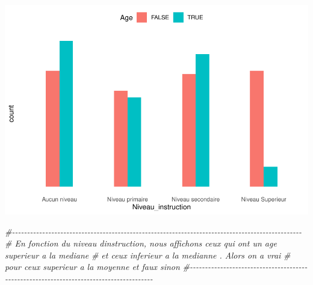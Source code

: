 \documentclass[
]{article}
\newenvironment{Shaded}{\begin{snugshade}}{\end{snugshade}}
\newcommand{\CommentTok}[1]{\textcolor[rgb]{0.56,0.35,0.01}{\textit{#1}}}
\begin{document}
\includegraphics{PROJET_files/figure-latex/unnamed-chunk-19-1.pdf}

\begin{Shaded}
\begin{Highlighting}[]
\CommentTok{\#{-}{-}{-}{-}{-}{-}{-}{-}{-}{-}{-}{-}{-}{-}{-}{-}{-}{-}{-}{-}{-}{-}{-}{-}{-}{-}{-}{-}{-}{-}{-}{-}{-}{-}{-}{-}{-}{-}{-}{-}{-}{-}{-}{-}{-}{-}{-}{-}{-}{-}{-}{-}{-}{-}{-}{-}{-}{-}{-}{-}{-}{-}{-}{-}{-}{-}{-}{-}{-}{-}{-}{-}{-}{-}{-}{-}{-}{-}{-}{-}{-}{-}{-}{-}{-}{-}{-}{-}{-}{-}{-}{-}{-}{-}{-}{-}}
\CommentTok{\#     En fonction du niveau d\textquotesingle{}instruction, nous affichons ceux qui ont un age superieur a la mediane }
\CommentTok{\#      et ceux inferieur a la medianne . Alors on a vrai}
\CommentTok{\#           pour ceux superieur a la moyenne et faux sinon}
\CommentTok{\#{-}{-}{-}{-}{-}{-}{-}{-}{-}{-}{-}{-}{-}{-}{-}{-}{-}{-}{-}{-}{-}{-}{-}{-}{-}{-}{-}{-}{-}{-}{-}{-}{-}{-}{-}{-}{-}{-}{-}{-}{-}{-}{-}{-}{-}{-}{-}{-}{-}{-}{-}{-}{-}{-}{-}{-}{-}{-}{-}{-}{-}{-}{-}{-}{-}{-}{-}{-}{-}{-}{-}{-}{-}{-}{-}{-}{-}{-}{-}{-}{-}{-}{-}{-}{-}{-}{-}{-}}
\end{Highlighting}
\end{Shaded}
\end{document}
